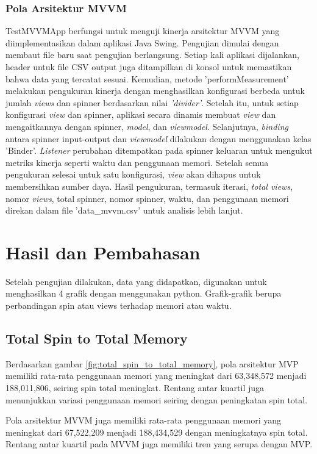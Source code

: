 \documentclass[conference]{IEEEtran}
\begin{document}
	\subsubsection{Pola Arsitektur MVVM}
	TestMVVMApp berfungsi untuk menguji kinerja arsitektur MVVM yang diimplementasikan dalam aplikasi Java Swing. Pengujian dimulai dengan membaut file baru saat pengujian berlangsung. Setiap kali aplikasi dijalankan, header untuk file CSV output juga ditampilkan di konsol untuk memastikan bahwa data yang tercatat sesuai. Kemudian, metode 'performMeasurement' melakukan pengukuran kinerja dengan menghasilkan konfigurasi berbeda untuk jumlah \textit{views} dan spinner berdasarkan nilai \textit{'divider'}. Setelah itu, untuk setiap konfigurasi \textit{view} dan spinner, aplikasi secara dinamis membuat \textit{view} dan mengaitkannya dengan spinner, \textit{model}, dan \textit{viewmodel}. Selanjutnya, \textit{binding} antara spinner input-output dan \textit{viewmodel} dilakukan dengan menggunakan kelas 'Binder'. \textit{Listener} perubahan ditempatkan pada spinner keluaran untuk mengukut metriks kinerja seperti waktu dan penggunaan memori. Setelah semua pengukuran selesai untuk satu konfigurasi, \textit{view} akan dihapus untuk membersihkan sumber daya. Hasil pengukuran, termasuk iterasi, \textit{total views}, nomor \textit{views}, total spinner, nomor spinner, waktu, dan penggunaan memori direkan dalam file 'data\_mvvm.csv' untuk analisis lebih lanjut. 
	
	\section{Hasil dan Pembahasan}
	Setelah pengujian dilakukan, data yang didapatkan, digunakan untuk menghasilkan 4 grafik dengan menggunakan python. Grafik-grafik berupa perbandingan spin atau views terhadap memori atau waktu.
	
	\subsection{Total Spin to Total Memory}
	Berdasarkan gambar \ref{fig:total_spin_to_total_memory},  pola arsitektur MVP memiliki rata-rata penggunaan memori yang meningkat dari 63,348,572 menjadi 188,011,806, seiring spin total meningkat. Rentang antar kuartil juga menunjukkan variasi penggunaan memori seiring dengan peningkatan spin total.
	
	Pola arsitektur MVVM juga memiliki rata-rata penggunaan memori yang meningkat dari 67,522,209 menjadi 188,434,529 dengan meningkatnya spin total. Rentang antar kuartil pada MVVM juga memiliki tren yang serupa dengan MVP.
	
\end{document}
